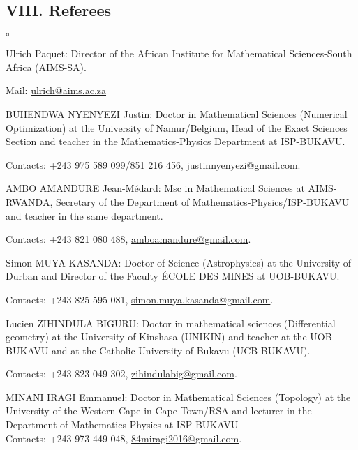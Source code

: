 \documentclass[10pt,a4paper,oneside]{article}
\begin{document}
 \subsection*{VIII. Referees}
\begin{list}{$ \circ$}{}
	\item
	\textrm{Ulrich Paquet}: Director of the African Institute for Mathematical Sciences-South Africa (AIMS-SA).
	
	Mail: \url{ulrich@aims.ac.za}\\
\item
BUHENDWA NYENYEZI Justin: Doctor in Mathematical Sciences (Numerical Optimization) at the University of Namur/Belgium, Head of the Exact Sciences Section and teacher in the Mathematics-Physics Department at ISP-BUKAVU.

Contacts: +243 975 589 099/851 216 456, \url{justinnyenyezi@gmail.com}.	\\



\item
AMBO AMANDURE Jean-Médard: Msc in Mathematical Sciences at AIMS-RWANDA, Secretary of the Department of Mathematics-Physics/ISP-BUKAVU and teacher in the same department.

Contacts: +243 821 080 488, \url{amboamandure@gmail.com}.	\\


\item
Simon MUYA KASANDA: Doctor of Science (Astrophysics) at the University of Durban and Director of the Faculty ÉCOLE DES MINES at UOB-BUKAVU. 

Contacts: +243 825 595 081, \url{simon.muya.kasanda@gmail.com}.\\
\item
Lucien ZIHINDULA BIGURU: Doctor in mathematical sciences (Differential geometry) at the University of Kinshasa (UNIKIN) and teacher at the UOB-BUKAVU and at the Catholic University of Bukavu (UCB BUKAVU).

Contacts: +243 823 049 302, \url{zihindulabig@gmail.com}.\\
\item
MINANI IRAGI Emmanuel: Doctor in Mathematical Sciences (Topology) at the University of the Western Cape in Cape Town/RSA and lecturer in the Department of Mathematics-Physics at ISP-BUKAVU\\
 Contacts: +243  973 449 048, \url{84miragi2016@gmail.com}.\\
\end{list}
\begin{flushright}
	
{}
\end{flushright}
\end{document}
